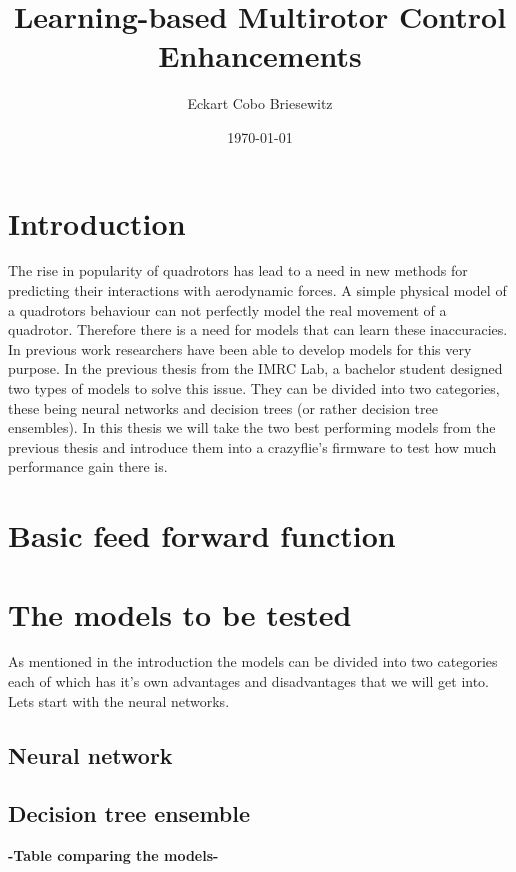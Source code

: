 \documentclass[11pt]{article}
\title{ Learning-based Multirotor Control Enhancements }
\author{ Eckart Cobo Briesewitz }
\date{\today}
\begin{document}
\maketitle
\pagebreak


\section{Introduction}
The rise in popularity of quadrotors has lead to a need in new methods for predicting their interactions with aerodynamic forces. A simple physical model of a quadrotors behaviour can not perfectly model the real movement of a quadrotor. Therefore there is a need for models that can learn these inaccuracies. In previous work researchers have been able to develop models for this very purpose. In the previous thesis from the IMRC Lab, a bachelor student designed two types of models to solve this issue. They can be divided into two categories, these being neural networks and decision trees (or rather decision tree ensembles). In this thesis we will take the two best performing models from the previous thesis and introduce them into a crazyflie's firmware to test how much performance gain there is.

\section{Basic feed forward function}

\section{The models to be tested}
As mentioned in the introduction the models can be divided into two categories each of which has it's own advantages and disadvantages that we will get into. Lets start with the neural networks.
\subsection{Neural network}
\subsection{Decision tree ensemble}

\textbf{-Table comparing the models-}
\end{document}
